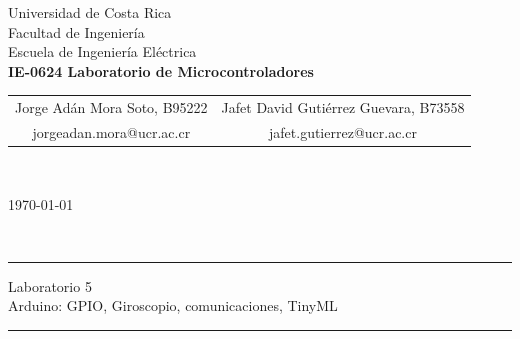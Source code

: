 \thispagestyle{empty}
\begin{center}
    \LARGE{\sc Universidad de Costa Rica}\\[-1mm]\Large{Facultad de Ingeniería}\\[-1mm]\Large{Escuela de Ingeniería} Eléctrica\\[2mm]\large{\textbf{IE-0624 Laboratorio de Microcontroladores}}
    \\[-0.10mm]
\begin{table}[H]
\centering
\begin{tabular}{cc}
Jorge Adán Mora Soto, B95222 & Jafet David Gutiérrez Guevara, B73558 \\
 \textcolor{ucrblue}{ \small{jorgeadan.mora@ucr.ac.cr}}    &  \textcolor{ucrblue}{ \small{jafet.gutierrez@ucr.ac.cr}}
\end{tabular}
\\[-6mm]
\end{table}
\large{\today}
\end{center}


\\[-1.5cm]
\hrule
\begin{center}
\Large{Laboratorio 5}\\ \large{Arduino: GPIO, Giroscopio, comunicaciones, TinyML}
\\[4mm]
\end{center}
\hrule
\vspace{8mm}
